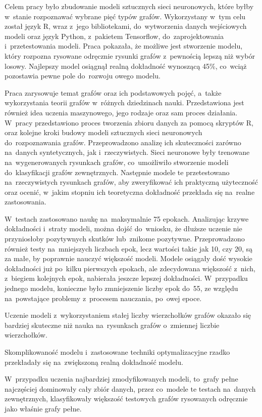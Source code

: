 Celem pracy było zbudowanie modeli sztucznych sieci neuronowych,
które byłby w~stanie rozpoznawać wybrane pięć typów grafów.
Wykorzystany w~tym celu został język R, wraz z~jego bibliotekami, do~wytworzenia danych wejściowych modeli
oraz język Python, z~pakietem Tensorflow, do~zaprojektowania i~przetestowania modeli.
Praca pokazała, że możliwe jest stworzenie modelu, który rozpozna rysowane odręcznie rysunki grafów
z~pewnością lepszą niż wybór losowy.
Najlepszy model osiągnął realną dokładność wynoszącą 45\%,
co~wciąż pozostawia pewne pole do~rozwoju owego modelu.

Praca zarysowuje temat grafów oraz ich podstawowych pojęć,
a~także wykorzystania teorii grafów w~różnych dziedzinach nauki.
Przedstawiona jest również idea uczenia maszynowego,
jego rodzaje oraz sam proces działania.
W~pracy przedstawiono proces tworzenia zbioru danych za pomocą skryptów R,
oraz kolejne kroki budowy modeli sztucznych sieci neuronowych do~rozpoznawania grafów.
Przeprowadzono analizę ich skuteczności zarówno na~danych syntetycznych, jak i~rzeczywistych.
Sieci neuronowe były trenowane na~wygenerowanych rysunkach grafów,
co~umożliwiło stworzenie modeli do~klasyfikacji grafów zewnętrznych.
Następnie modele te przetestowano na~rzeczywistych rysunkach grafów,
aby zweryfikować ich praktyczną użyteczność oraz ocenić,
w~jakim stopniu ich teoretyczna dokładność przekłada się na~realne zastosowania.

W~testach zastosowano naukę na~maksymalnie 75 epokach.
Analizując krzywe dokładności i~straty modeli, można dojść do~wniosku,
że dłuższe uczenie nie przyniosłoby pozytywnych skutków lub~znikome pozytywne.
Przeprowadzono również testy na~mniejszych liczbach epok, lecz wartości takie jak 10, czy 20,
są za małe, by poprawnie nauczyć większość modeli.
Modele osiągały dość wysokie dokładności już po~kilku pierwszych epokach,
ale zdecydowana większość z~nich, z~biegiem kolejnych epok, nabierała jeszcze lepszej dokładności.
W~przypadku jednego modelu, konieczne było zmniejszenie liczby epok do~55,
ze względu na~powstające problemy z~procesem nauczania, po~owej epoce.

Uczenie modeli z~wykorzystaniem stałej liczby wierzchołków grafów okazało się bardziej skuteczne
niż nauka na~rysunkach grafów o~zmiennej liczbie wierzchołków.

Skomplikowaność modelu i~zastosowane techniki optymalizacyjne rzadko przekładały się na~zwiększoną realną dokładność modelu.

W~przypadku uczenia najbardziej zmodyfikowanych modeli, to~grafy pełne najczęściej dominowały cały zbiór danych,
przez co~modele te testach na~danych zewnętrznych,
klasyfikowały większość testowych grafów rysowanych odręcznie jako właśnie grafy pełne.

